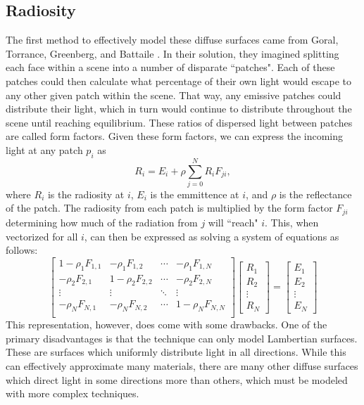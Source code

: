 \documentclass[conference]{IEEEtran}
\begin{document}
\subsection{Radiosity}
The first method to effectively model these diffuse surfaces came from Goral, Torrance, Greenberg, and Battaile \cite{b1}. In their solution, they imagined splitting each face within a scene into a number of disparate ``patches". Each of these patches could then calculate what percentage of their own light would escape to any other given patch within the scene. That way, any emissive patches could distribute their light, which in turn would continue to distribute throughout the scene until reaching equilibrium. These ratios of dispersed light between patches are called form factors. Given these form factors, we can express the incoming light at any patch $p_i$ as 
\[ 
R_i = E_i + \rho \sum \limits_{j=0}^{N} R_i F_{ji},
\]
where $R_i$ is the radiosity at $i$, $E_i$ is the emmittence at $i$, and $\rho$ is the reflectance of the patch. The radiosity from each patch is multiplied by the form factor $F_{ji}$ determining how much of the radiation from $j$ will ``reach" $i$. This, when vectorized for all $i$, can then be expressed as solving a system of equations as follows:
\[
\begin{bmatrix}
1-\rho_1 F_{1,1} & -\rho_1F_{1,2} & \cdots & -\rho_1F_{1,N}\\
-\rho_2 F_{2,1} & 1-\rho_2F_{2,2} & \cdots & -\rho_2F_{2,N}\\
\vdots & \vdots & \ddots & \vdots\\
-\rho_N F_{N,1} & -\rho_NF_{N,2} & \cdots & 1-\rho_NF_{N,N}\\
\end{bmatrix} \begin{bmatrix}
    R_1 \\ R_2 \\ \vdots \\ R_N
\end{bmatrix} = \begin{bmatrix}
    E_1\\E_2\\\vdots\\E_N
\end{bmatrix}
\]
This representation, however, does come with some drawbacks. One of the primary disadvantages is that the technique can only model Lambertian surfaces. These are surfaces which uniformly distribute light in all directions. While this can effectively approximate many materials, there are many other diffuse surfaces which direct light in some directions more than others, which must be modeled with more complex techniques.
\end{document}
